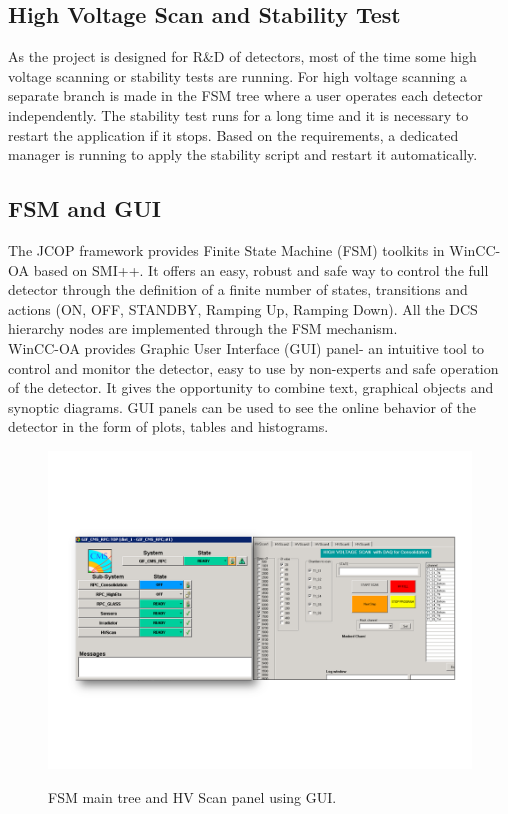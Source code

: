 \documentclass[a4paper,11pt]{article}
\begin{document}
\subsection{High Voltage Scan and Stability Test}
As the project is designed for R\&D of detectors, most of the time some high voltage scanning or stability tests are running. For high voltage scanning a separate branch is made in the FSM tree where a user operates each detector independently. The stability test runs for a long time and it is necessary to restart the application if it stops. Based on the requirements, a dedicated manager is running to apply the stability script and restart it automatically.    
\subsection{FSM and GUI} 
The JCOP framework provides Finite State Machine (FSM) toolkits in WinCC-OA based on SMI++. It offers an easy, robust and safe way to control the full detector through the definition of a finite number of states, transitions and actions (ON, OFF, STANDBY, Ramping Up, Ramping Down). All the DCS hierarchy nodes are implemented through the FSM mechanism.\\
WinCC-OA provides Graphic User Interface (GUI) panel- an intuitive tool to control and monitor the detector, easy to use by non-experts and safe operation of the detector. It gives the opportunity to combine text, graphical objects and synoptic diagrams. GUI panels can be used to see the online behavior of the detector in the form of plots, tables and histograms. 

\begin{figure}[H]
\centering
\hspace{-0.50cm}
\includegraphics[scale=0.66,trim=30 150 30 140,clip]{images/GUI.png}\\
 \caption{FSM main tree and HV Scan panel using GUI.}
\label{gui}
\end{figure}
\end{document}
